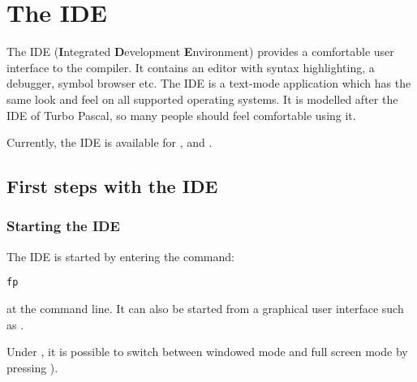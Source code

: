 %
%
%
%
%
\chapter{The IDE}

The IDE (\textbf{I}ntegrated \textbf{D}evelopment \textbf{E}nvironment)
provides a comfortable user interface to the compiler. It contains an 
editor with syntax highlighting, a debugger, symbol browser etc. 
The IDE is a text-mode application which has the same look and feel 
on all supported operating systems. It is modelled after the IDE of Turbo
Pascal, so many people should feel comfortable using it.

Currently, the IDE is available for \dos, \windows and \linux.

\section{First steps with the IDE}
%
%
\subsection{Starting the IDE}
The IDE is started by entering the command:
\begin{verbatim}
fp
\end{verbatim}
at the command line. It can also be started from a graphical user 
interface such as \windows. 
\begin{remark}
Under \windows, it is possible to switch between windowed mode and 
full screen mode by pressing ).
\end{remark}
%
%
